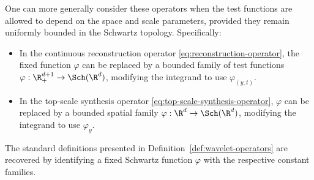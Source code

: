 \begin{remark} \label{rem:variable-test-functions} One can more generally consider these operators when the test functions are allowed to depend on the space and scale parameters, provided they remain uniformly bounded in the Schwartz topology.
Specifically:

\begin{itemize}

\item In the continuous reconstruction operator \eqref{eq:reconstruction-operator}, the fixed function $\varphi$ can be replaced by a bounded family of test functions $\varphi: \R^{d+1}_+ \to \Sch(\R^d)$, modifying the integrand to use $\varphi_{(y,t)}$.
\item In the top-scale synthesis operator \eqref{eq:top-scale-synthesis-operator}, $\varphi$ can be replaced by a bounded spatial family $\varphi: \R^d \to \Sch(\R^d)$, modifying the integrand to use $\varphi_y$.
\end{itemize}
The standard definitions presented in Definition~\ref{def:wavelet-operators} are recovered by identifying a fixed Schwartz function $\varphi$ with the respective constant families.

\end{remark}
